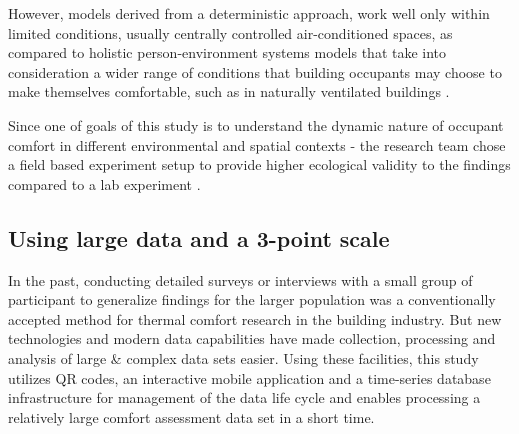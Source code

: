\documentclass[]{interact}
\theoremstyle{plain}%
\theoremstyle{definition}
\theoremstyle{remark}
\begin{document}
However, models derived from a deterministic approach, work well only within limited conditions, usually centrally controlled air-conditioned spaces, as compared to holistic person-environment systems models that take into consideration a wider range of conditions that building occupants may choose to make themselves comfortable, such as in naturally ventilated buildings \cite{dedear2, de1998developing}. 

Since one of goals of this study is to understand the dynamic nature of occupant comfort in different environmental and spatial contexts - the research team chose a field based experiment setup to provide higher ecological validity to the findings compared to a lab experiment \cite{andrade2018internal}. 





\subsection{Using large data and a 3-point scale}

In the past, conducting detailed surveys or interviews with a small group of participant to generalize findings for the larger population was a conventionally accepted method for thermal comfort research in the building industry. But new technologies and modern data capabilities have made collection, processing and analysis of large \& complex data sets easier. Using these facilities, this study utilizes QR codes, an interactive mobile application and a time-series database infrastructure for management of the data life cycle and enables processing a relatively large comfort assessment data set in a short time. 
\end{document}
